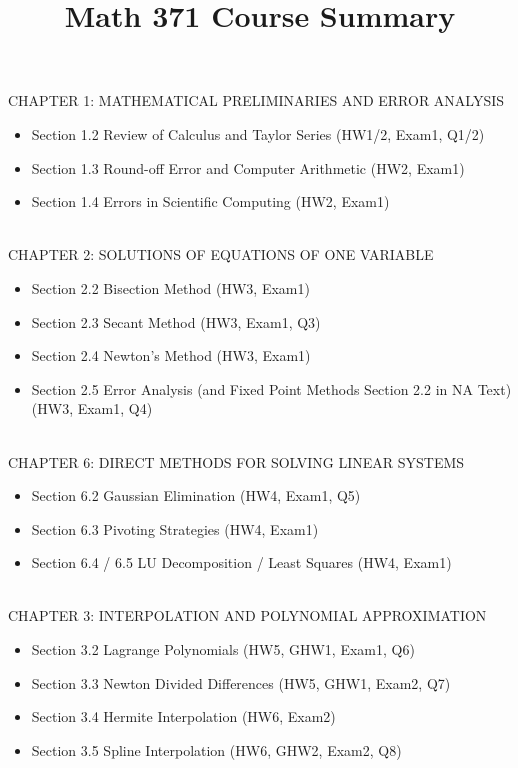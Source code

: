 \documentclass[11pt]{amsart}
\begin{document}
\title{Math 371 Course Summary}
\maketitle
CHAPTER 1: MATHEMATICAL PRELIMINARIES AND ERROR ANALYSIS \\
\begin{itemize}[leftmargin=*]
\item Section 1.2 Review of Calculus and Taylor Series (HW1/2, Exam1, Q1/2)
\item Section 1.3 Round-off Error and Computer Arithmetic (HW2, Exam1)
\item Section 1.4 Errors in Scientific Computing (HW2, Exam1)
\end{itemize}
\ \\
CHAPTER 2: SOLUTIONS OF EQUATIONS OF ONE VARIABLE \\
\begin{itemize}[leftmargin=*]
\item Section 2.2 Bisection Method (HW3, Exam1)
\item Section 2.3 Secant Method (HW3, Exam1, Q3)
\item Section 2.4 Newton's Method (HW3, Exam1)
\item Section 2.5 Error Analysis (and Fixed Point Methods Section 2.2 in NA Text) (HW3, Exam1, Q4)
\end{itemize}
\ \\
CHAPTER 6: DIRECT METHODS FOR SOLVING LINEAR SYSTEMS \\
\begin{itemize}[leftmargin=*]
\item Section 6.2 Gaussian Elimination (HW4, Exam1, Q5)
\item Section 6.3 Pivoting Strategies (HW4, Exam1)
\item Section 6.4 / 6.5 LU Decomposition / Least Squares (HW4, Exam1)
\end{itemize}
\ \\
CHAPTER 3: INTERPOLATION AND POLYNOMIAL APPROXIMATION \\
\begin{itemize}[leftmargin=*]
\item Section 3.2 Lagrange Polynomials (HW5, GHW1, Exam1, Q6)
\item Section 3.3 Newton Divided Differences (HW5, GHW1, Exam2, Q7)
\item Section 3.4 Hermite Interpolation (HW6, Exam2)
\item Section 3.5 Spline Interpolation (HW6, GHW2, Exam2, Q8)
\end{itemize}
\end{document}
